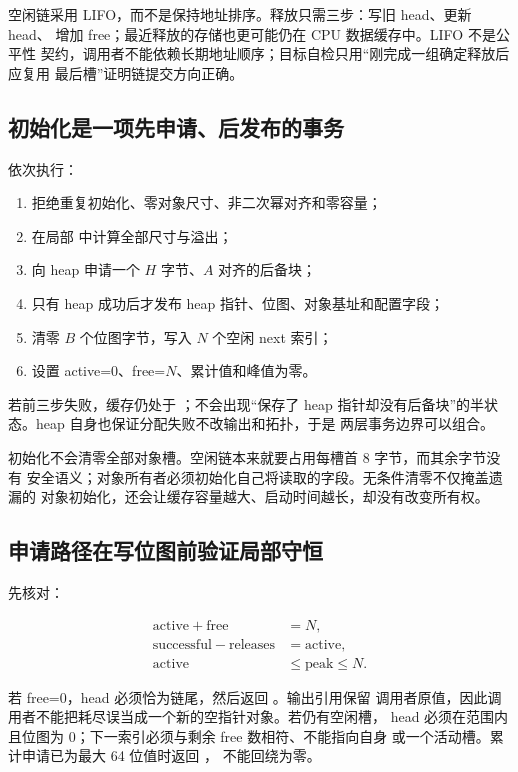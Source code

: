 空闲链采用 LIFO，而不是保持地址排序。释放只需三步：写旧 head、更新 head、
增加 free；最近释放的存储也更可能仍在 CPU 数据缓存中。LIFO 不是公平性
契约，调用者不能依赖长期地址顺序；目标自检只用“刚完成一组确定释放后应复用
最后槽”证明链提交方向正确。

\subsection{初始化是一项先申请、后发布的事务}

 依次执行：

\begin{enumerate}[label=\arabic*.]
  \item 拒绝重复初始化、零对象尺寸、非二次幂对齐和零容量；
  \item 在局部  中计算全部尺寸与溢出；
  \item 向 heap 申请一个 \(H\) 字节、\(A\) 对齐的后备块；
  \item 只有 heap 成功后才发布 heap 指针、位图、对象基址和配置字段；
  \item 清零 \(B\) 个位图字节，写入 \(N\) 个空闲 next 索引；
  \item 设置 active=0、free=\(N\)、累计值和峰值为零。
\end{enumerate}

若前三步失败，缓存仍处于 ；不会出现“保存了 heap
指针却没有后备块”的半状态。heap 自身也保证分配失败不改输出和拓扑，于是
两层事务边界可以组合。

初始化不会清零全部对象槽。空闲链本来就要占用每槽首 8 字节，而其余字节没有
安全语义；对象所有者必须初始化自己将读取的字段。无条件清零不仅掩盖遗漏的
对象初始化，还会让缓存容量越大、启动时间越长，却没有改变所有权。

\subsection{申请路径在写位图前验证局部守恒}

 先核对：

\[
\begin{aligned}
\mathrm{active}+\mathrm{free}&=N,\\
\mathrm{successful}-\mathrm{releases}&=\mathrm{active},\\
\mathrm{active}&\le\mathrm{peak}\le N.
\end{aligned}
\]

若 free=0，head 必须恰为链尾，然后返回 。输出引用保留
调用者原值，因此调用者不能把耗尽误当成一个新的空指针对象。若仍有空闲槽，
head 必须在范围内且位图为 0；下一索引必须与剩余 free 数相符、不能指向自身
或一个活动槽。累计申请已为最大 64 位值时返回 ，
不能回绕为零。

